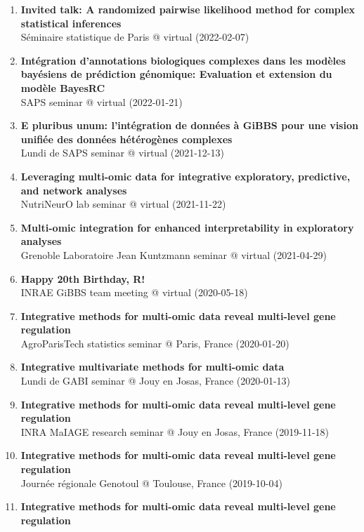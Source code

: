 \documentclass[11pt, a4paper]{awesome-cv}
\providecommand{\tightlist}{%
	\setlength{\itemsep}{0pt}\setlength{\parskip}{0pt}}
\begin{document}
\begin{enumerate}
\def\labelenumi{\arabic{enumi}.}
\tightlist
\item
  \textbf{Invited talk: A randomized pairwise likelihood method for
  complex statistical inferences}\\
  Séminaire statistique de Paris @ virtual (2022-02-07)
\item
  \textbf{Intégration d'annotations biologiques complexes dans les
  modèles bayésiens de prédiction génomique: Evaluation et extension du
  modèle BayesRC}\\
  SAPS seminar @ virtual (2022-01-21)
\item
  \textbf{E pluribus unum: l'intégration de données à GiBBS pour une
  vision unifiée des données hétérogènes complexes}\\
  Lundi de SAPS seminar @ virtual (2021-12-13)
\item
  \textbf{Leveraging multi-omic data for integrative exploratory,
  predictive, and network analyses}\\
  NutriNeurO lab seminar @ virtual (2021-11-22)
\item
  \textbf{Multi-omic integration for enhanced interpretability in
  exploratory analyses}\\
  Grenoble Laboratoire Jean Kuntzmann seminar @ virtual (2021-04-29)
\item
  \textbf{Happy 20th Birthday, R!}\\
  INRAE GiBBS team meeting @ virtual (2020-05-18)
\item
  \textbf{Integrative methods for multi-omic data reveal multi-level
  gene regulation}\\
  AgroParisTech statistics seminar @ Paris, France (2020-01-20)
\item
  \textbf{Integrative multivariate methods for multi-omic data}\\
  Lundi de GABI seminar @ Jouy en Josas, France (2020-01-13)
\item
  \textbf{Integrative methods for multi-omic data reveal multi-level
  gene regulation}\\
  INRA MaIAGE research seminar @ Jouy en Josas, France (2019-11-18)
\item
  \textbf{Integrative methods for multi-omic data reveal multi-level
  gene regulation}\\
  Journée régionale Genotoul @ Toulouse, France (2019-10-04)
\item
  \textbf{Integrative methods for multi-omic data reveal multi-level
  gene regulation}\\

\end{enumerate}
\end{document}
